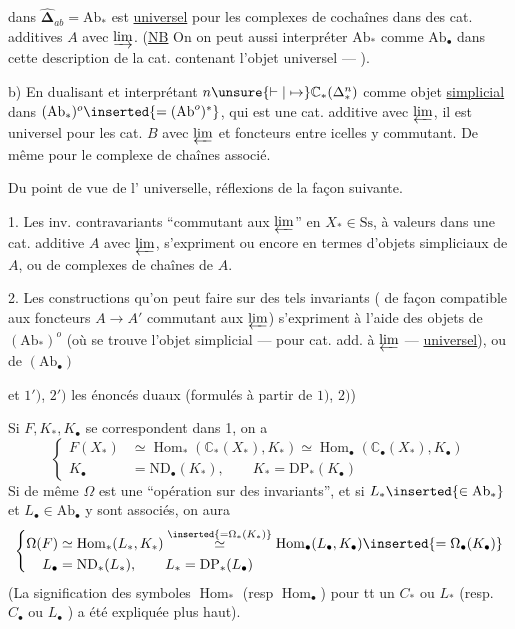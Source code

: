 dans $\widehat{\boldsymbol\Delta}_{ab}=\mathrm{Ab}_*$ est \uline{universel} pour les
complexes de cochaînes dans des cat.
additives $A$ avec $\varinjlim$. \unsure{\&} (\uline{NB} On 
on peut aussi interpréter $\mathrm{Ab}_*$ comme $\mathrm{Ab}_\bullet$
dans cette description de la cat. contenant
l'objet universel --- ).

b) En dualisant et interprétant
$n\unsure{\vdash|\mapsto}\mathbb C_*(\Delta^n_*)$ comme objet \uline{simplicial}
dans $(\mathrm{Ab}_*)^o\inserted{=(\mathrm{Ab}^o)^*}$, qui est une cat. additive
avec $\varprojlim$, il est universel pour les
cat. $B$ avec $\varprojlim$ et foncteurs entre
icelles y commutant. De même pour le
complexe de chaînes associé.

Du point de vue de l' universelle,
réflexions de la façon suivante.

1. Les inv. contravariants ``commutant aux
$\varprojlim$'' en $X_*\in\mathrm{Ss}$, à valeurs dans une
cat. additive $A$ avec $\varprojlim$, s'expriment
ou encore en termes d'objets simpliciaux
de $A$, ou de complexes de chaînes de $A$.

2. Les constructions qu'on peut faire sur des
tels invariants ( de façon compatible aux
foncteurs $A\longrightarrow A'$ commutant aux $\varprojlim$)
s'expriment à l'aide des objets
de $(\mathrm{Ab}_*)^o$ (où se trouve l'objet
simplicial --- pour cat. add. à $\varprojlim$ ---
\uline{universel}), ou de $(\mathrm{Ab}_\bullet)$

et $1')$, $2')$ les énoncés duaux (formulés
à partir de $1)$, $2)$)

Si $F,K_*,K_\bullet$ se correspondent dans
1, on a
\[
\left\{\begin{aligned}
F(X_*)&\simeq\operatorname{Hom}_*(\mathbb C_*(X_*),K_*)\simeq
\operatorname{Hom}_\bullet(\mathbb C_\bullet(X_*),K_\bullet)\\
K_\bullet&=\mathrm{ND}_\bullet(K_*),\qquad K_*=\mathrm{DP}_*(K_\bullet)
\end{aligned}\right.
\]
Si de même $\Omega$ est une ``opération sur des
invariants'', et si $L_*\inserted{\in\mathrm{Ab}_*}$ et $L_\bullet\in\mathrm{Ab}_\bullet$ y
sont associés, on aura
\[
\left\{\begin{aligned}
\Omega(F)&\simeq\operatorname{Hom}_*(L_*,K_*)\overset{\inserted{=\Omega_*(K_*)}}\simeq
\operatorname{Hom}_\bullet(L_\bullet,K_\bullet)\inserted{=\Omega_\bullet(K_\bullet)}\\
L_\bullet&=\mathrm{ND}_*(L_*),\qquad L_*=\mathrm{DP}_*(L_\bullet)
\end{aligned}\right.
\]
(La signification des symboles $\operatorname{Hom}_*$ (resp $\operatorname{Hom}_\bullet$)
pour tt un $C_*$ ou $L_*$  (resp. $C_\bullet$ ou $L_\bullet$ )
a été expliquée plus haut).

